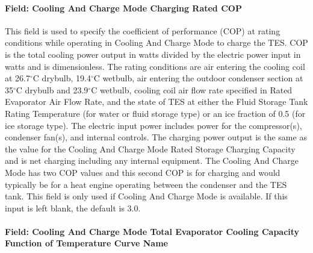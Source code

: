 \paragraph{Field: Cooling And Charge Mode Charging Rated COP}\label{field-cooling-and-charge-mode-charging-rated-cop}

This field is used to specify the coefficient of performance (COP) at rating conditions while operating in Cooling And Charge Mode to charge the TES. COP is the total cooling power output in watts divided by the electric power input in watts and is dimensionless. The rating conditions are air entering the cooling coil at 26.7$^\circ$C drybulb, 19.4$^\circ$C wetbulb, air entering the outdoor condenser section at 35$^\circ$C drybulb and 23.9$^\circ$C wetbulb, cooling coil air flow rate specified in Rated Evaporator Air Flow Rate, and the state of TES at either the Fluid Storage Tank Rating Temperature (for water or fluid storage type) or an ice fraction of 0.5 (for ice storage type). The electric input power includes power for the compressor(s), condenser fan(s), and internal controls. The charging power output is the same as the value for the Cooling And Charge Mode Rated Storage Charging Capacity and is net charging including any internal equipment. The Cooling And Charge Mode has two COP values and this second COP is for charging and would typically be for a heat engine operating between the condenser and the TES tank. This field is only used if Cooling And Charge Mode is available. If this input is left blank, the default is 3.0.

\paragraph{Field: Cooling And Charge Mode Total Evaporator Cooling Capacity Function of Temperature Curve Name}\label{field-cooling-and-charge-mode-total-evaporator-cooling-capacity-function-of-temperature-curve-name}

